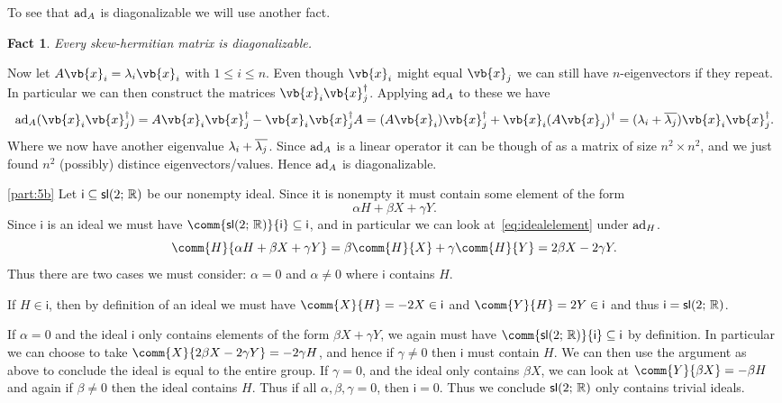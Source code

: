 \documentclass[
	pages,
	boxes,
	color=WildStrawberry
]{homework}
\theoremstyle{plain}
\newtheorem{fact}{Fact}
\begin{document}
\begin{solution}
	To see that $\operatorname{ad}_A$ is diagonalizable we will use another fact.
	\begin{fact}
		Every skew-hermitian matrix is diagonalizable.
	\end{fact}
	Now let $A\vb{x}_i = \lambda_i\vb{x}_i$ with $1 \leq i \leq n$. Even though $\vb{x}_i$ might equal $\vb{x}_j$ we can still have $n$-eigenvectors if they repeat. In particular we can then construct the matrices $\vb{x}_i\vb{x}_j^\dagger$. Applying $\operatorname{ad}_A$ to these we have
	\begin{equation*}
		\ad_A(\vb{x}_i\vb{x}_j^\dagger) = A\vb{x}_i\vb{x}_j^\dagger - \vb{x}_i\vb{x}_j^\dagger A = (A\vb{x}_i)\vb{x}_j^\dagger + \vb{x}_i(A\vb{x}_j)^\dagger = (\lambda_i + \conj{\lambda_j})\vb{x}_i\vb{x}_j^\dagger.
	\end{equation*}
	Where we now have another eigenvalue $\lambda_i + \overline{\lambda_j}$. Since $\operatorname{ad}_A$ is a linear operator it can be though of as a matrix of size $n^2\times n^2$, and we just found $n^2$ (possibly) distince eigenvectors/values. Hence $\operatorname{ad}_A$ is diagonalizable.


	\ref{part:5b}
	Let $\mathsf{i}\subseteq\mathsf{sl}(2;\, \mathbb{R})$ be our nonempty ideal. Since it is nonempty it must contain some element of the form
	\begin{equation}\label{eq:idealelement}
		\alpha H + \beta X + \gamma Y.
	\end{equation}
	Since $\mathsf{i}$ is an ideal we must have $\comm{\slie{2}{\R}}{\mathsf{i}}\subseteq \mathsf{i}$, and in particular we can look at~\cref{eq:idealelement} under $\operatorname{ad}_H$.
	\begin{equation*}
		\comm{H}{\alpha H + \beta X + \gamma Y} = \beta\comm{H}{X} + \gamma\comm{H}{Y} = 2\beta X - 2\gamma Y.
	\end{equation*}
	Thus there are two cases we must consider: $\alpha = 0$ and $\alpha \neq 0$ where $\mathsf{i}$ contains $H$.

	If $H\in\mathsf{i}$, then by definition of an ideal we must have $\comm{X}{H} = -2X\in\mathsf{i}$ and $\comm{Y}{H} = 2Y\in\mathsf{i}$ and thus $\mathsf{i} = \mathsf{sl}(2;\, \mathbb{R})$.

	If $\alpha = 0$ and the ideal $\mathsf{i}$ only contains elements of the form $\beta X + \gamma Y$, we again must have $\comm{\slie{2}{\R}}{\mathsf{i}}\subseteq \mathsf{i}$ by definition. In particular we can choose to take $\comm{X}{2\beta X - 2\gamma Y} = -2\gamma H$, and hence if $\gamma \neq 0$ then $\mathsf{i}$ must contain $H$. We can then use the argument as above to conclude the ideal is equal to the entire group. If $\gamma = 0$, and the ideal only contains $\beta X$, we can look at $\comm{Y}{\beta X} = -\beta H$ and again if $\beta \neq 0$ then the ideal contains $H$. Thus if all $\alpha, \beta, \gamma = 0$, then $\mathsf{i} = \qty{0}$. Thus we conclude $\mathsf{sl}(2;\, \mathbb{R})$ only contains trivial ideals.


\end{solution}
\end{document}
